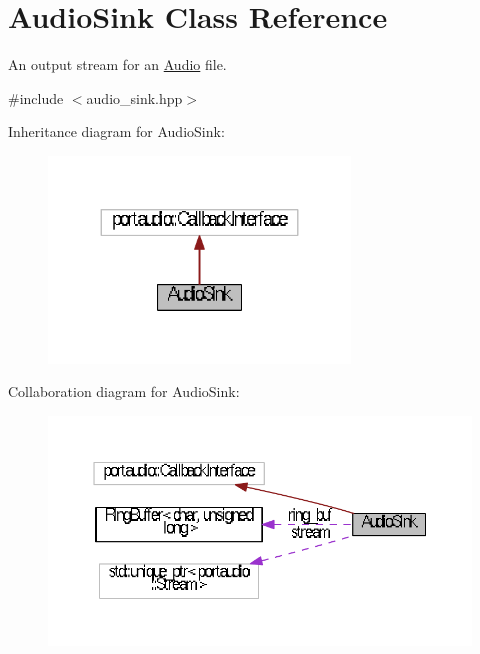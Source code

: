 \hypertarget{classAudioSink}{\section{Audio\+Sink Class Reference}
\label{classAudioSink}
}


An output stream for an \hyperlink{classAudio}{Audio} file.  




{\ttfamily \#include $<$audio\+\_\+sink.\+hpp$>$}



Inheritance diagram for Audio\+Sink\+:
\nopagebreak
\begin{figure}[H]
\begin{center}
\leavevmode
\includegraphics[width=227pt]{classAudioSink__inherit__graph}
\end{center}
\end{figure}


Collaboration diagram for Audio\+Sink\+:
\nopagebreak
\begin{figure}[H]
\begin{center}
\leavevmode
\includegraphics[width=350pt]{classAudioSink__coll__graph}
\end{center}
\end{figure}
